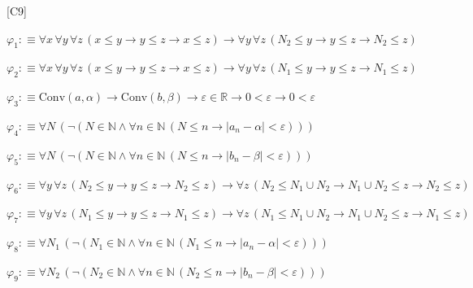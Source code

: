 \begin{fullproof}{[C9]}
\begin{ptree}
\noLine
{}
\end{ptree}
\begin{abbrevlist}
\item $\varphi_{1} :\equiv \forall x\,\forall y\,\forall z\,(x \leq y \to y \leq z \to x \leq z) \to \forall y\,\forall z\,(N_{2} \leq y \to y \leq z \to N_{2} \leq z)$
\item $\varphi_{2} :\equiv \forall x\,\forall y\,\forall z\,(x \leq y \to y \leq z \to x \leq z) \to \forall y\,\forall z\,(N_{1} \leq y \to y \leq z \to N_{1} \leq z)$
\item $\varphi_{3} :\equiv \mathrm{Conv}(a,\alpha) \to \mathrm{Conv}(b,\beta) \to \varepsilon \in \mathbb{R} \to 0 < \varepsilon \to 0 < \varepsilon$
\item $\varphi_{4} :\equiv \forall N\,(\neg (N \in \mathbb{N} \land \forall n \in \mathbb{N}\,(N \leq n \to \lvert a_{n} - \alpha \rvert < \varepsilon)))$
\item $\varphi_{5} :\equiv \forall N\,(\neg (N \in \mathbb{N} \land \forall n \in \mathbb{N}\,(N \leq n \to \lvert b_{n} - \beta \rvert < \varepsilon)))$
\item $\varphi_{6} :\equiv \forall y\,\forall z\,(N_{2} \leq y \to y \leq z \to N_{2} \leq z) \to \forall z\,(N_{2} \leq N_{1} \cup N_{2} \to N_{1} \cup N_{2} \leq z \to N_{2} \leq z)$
\item $\varphi_{7} :\equiv \forall y\,\forall z\,(N_{1} \leq y \to y \leq z \to N_{1} \leq z) \to \forall z\,(N_{1} \leq N_{1} \cup N_{2} \to N_{1} \cup N_{2} \leq z \to N_{1} \leq z)$
\item $\varphi_{8} :\equiv \forall N_{1}\,(\neg (N_{1} \in \mathbb{N} \land \forall n \in \mathbb{N}\,(N_{1} \leq n \to \lvert a_{n} - \alpha \rvert < \varepsilon)))$
\item $\varphi_{9} :\equiv \forall N_{2}\,(\neg (N_{2} \in \mathbb{N} \land \forall n \in \mathbb{N}\,(N_{2} \leq n \to \lvert b_{n} - \beta \rvert < \varepsilon)))$

\end{abbrevlist}
\end{fullproof}
